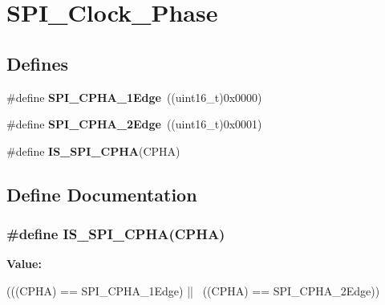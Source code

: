 \hypertarget{group__SPI__Clock__Phase}{
\section{SPI\_\-Clock\_\-Phase}
\label{group__SPI__Clock__Phase}
}
\subsection*{Defines}
\begin{DoxyCompactItemize}
\item 
\hypertarget{group__SPI__Clock__Phase_gaade9d9555fac8a302bde5c94da9c7292}{
\#define {\bfseries SPI\_\-CPHA\_\-1Edge}~((uint16\_\-t)0x0000)}
\label{group__SPI__Clock__Phase_gaade9d9555fac8a302bde5c94da9c7292}

\item 
\hypertarget{group__SPI__Clock__Phase_ga7543f88bf05a08705eb4203862dcebdf}{
\#define {\bfseries SPI\_\-CPHA\_\-2Edge}~((uint16\_\-t)0x0001)}
\label{group__SPI__Clock__Phase_ga7543f88bf05a08705eb4203862dcebdf}

\item 
\#define {\bfseries IS\_\-SPI\_\-CPHA}(CPHA)
\end{DoxyCompactItemize}


\subsection{Define Documentation}
\hypertarget{group__SPI__Clock__Phase_ga6441f08edf79dd5b243c54b888d3cbf7}{
\subsubsection[{IS\_\-SPI\_\-CPHA}]{\setlength{\rightskip}{0pt plus 5cm}\#define IS\_\-SPI\_\-CPHA(CPHA)}}
\label{group__SPI__Clock__Phase_ga6441f08edf79dd5b243c54b888d3cbf7}
{\bfseries Value:}
\begin{DoxyCode}
(((CPHA) == SPI_CPHA_1Edge) || \
                           ((CPHA) == SPI_CPHA_2Edge))
\end{DoxyCode}

